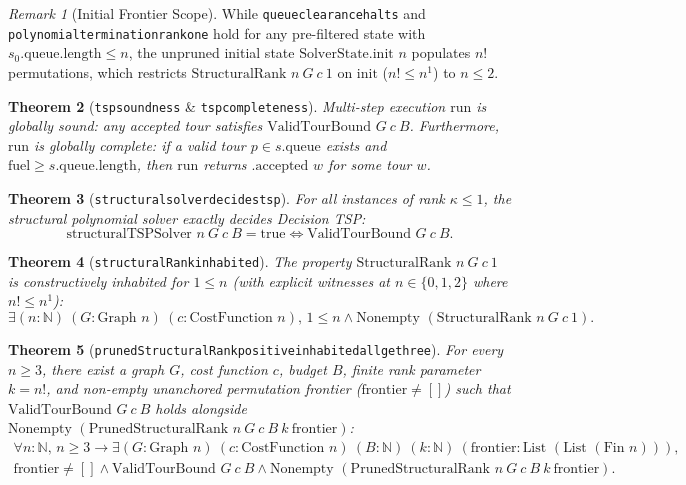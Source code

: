 \documentclass[11pt,a4paper]{article}
\renewcommand{\_}{\origunderscore\allowbreak}
\theoremstyle{plain}
\newtheorem{theorem}{Theorem}[section]
\theoremstyle{definition}
\theoremstyle{remark}
\newtheorem{remark}[theorem]{Remark}
\begin{document}
\begin{remark}[Initial Frontier Scope]
While \texttt{queue\_clearance\_halts} and \texttt{polynomial\_termination\_rank\_one} hold for any pre-filtered state with $s_0.\text{queue}.\text{length} \le n$, the unpruned initial state $\text{SolverState.init } n$ populates $n!$ permutations, which restricts $\text{StructuralRank } n\ G\ c\ 1$ on $\text{init}$ ($n! \le n^1$) to $n \le 2$.
\end{remark}

\begin{theorem}[\texttt{tsp\_soundness} \& \texttt{tsp\_completeness}]
Multi-step execution $\text{run}$ is globally sound: any accepted tour satisfies $\text{ValidTourBound } G\ c\ B$. Furthermore, $\text{run}$ is globally complete: if a valid tour $p \in s.\text{queue}$ exists and $\text{fuel} \ge s.\text{queue}.\text{length}$, then $\text{run}$ returns $\text{.accepted } w$ for some tour $w$.
\end{theorem}

\begin{theorem}[\texttt{structural\_solver\_decides\_tsp}]
For all instances of rank $\kappa \le 1$, the structural polynomial solver exactly decides Decision TSP:
\begin{equation*}
  \text{structuralTSPSolver } n\ G\ c\ B = \text{true} \iff \text{ValidTourBound } G\ c\ B.
\end{equation*}
\end{theorem}

\begin{theorem}[\texttt{structural\allowbreak Rank\_inhabited}]
The property $\text{StructuralRank } n\ G\ c\ 1$ is constructively inhabited for $1 \le n$ (with explicit witnesses at $n \in \{0, 1, 2\}$ where $n! \le n^1$):
\begin{equation*}
  \exists (n : \mathbb{N})\ (G : \text{Graph } n)\ (c : \text{CostFunction } n),\, 1 \le n \land \text{Nonempty }(\text{StructuralRank } n\ G\ c\ 1).
\end{equation*}
\end{theorem}

\begin{theorem}[\texttt{pruned\allowbreak Structural\allowbreak Rank\_positive\_inhabited\_all\_ge\_three}]
For every $n \ge 3$, there exist a graph $G$, cost function $c$, budget $B$, finite rank parameter $k = n!$, and non-empty unanchored permutation frontier ($\text{frontier} \neq []$) such that $\text{ValidTourBound } G\ c\ B$ holds alongside $\text{Nonempty }(\text{PrunedStructuralRank } n\ G\ c\ B\ k\ \text{frontier})$:
\begin{equation*}
\begin{aligned}
  \forall n : \mathbb{N},\, n \ge 3 \to \exists (G : \text{Graph } n)\ (c : \text{CostFunction } n)\ (B : \mathbb{N})\ (k : \mathbb{N})\ (\text{frontier} : \text{List } (\text{List } (\text{Fin } n))), \\
  \text{frontier} \neq [] \land \text{ValidTourBound } G\ c\ B \land \text{Nonempty }(\text{PrunedStructuralRank } n\ G\ c\ B\ k\ \text{frontier}).
\end{aligned}
\end{equation*}
\end{theorem}
\end{document}

